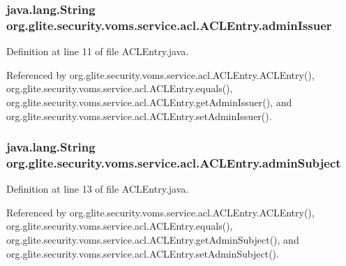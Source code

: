 \hypertarget{classorg_1_1glite_1_1security_1_1voms_1_1service_1_1acl_1_1ACLEntry_a04aa947f12248d78c84c941ef8cb8ab4}{
\subsubsection[{adminIssuer}]{\setlength{\rightskip}{0pt plus 5cm}java.lang.String {\bf org.glite.security.voms.service.acl.ACLEntry.adminIssuer}}}
\label{classorg_1_1glite_1_1security_1_1voms_1_1service_1_1acl_1_1ACLEntry_a04aa947f12248d78c84c941ef8cb8ab4}


Definition at line 11 of file ACLEntry.java.



Referenced by org.glite.security.voms.service.acl.ACLEntry.ACLEntry(), org.glite.security.voms.service.acl.ACLEntry.equals(), org.glite.security.voms.service.acl.ACLEntry.getAdminIssuer(), and org.glite.security.voms.service.acl.ACLEntry.setAdminIssuer().

\hypertarget{classorg_1_1glite_1_1security_1_1voms_1_1service_1_1acl_1_1ACLEntry_aa6011ea36c14ef998ec1966ee7188c2f}{
\subsubsection[{adminSubject}]{\setlength{\rightskip}{0pt plus 5cm}java.lang.String {\bf org.glite.security.voms.service.acl.ACLEntry.adminSubject}}}
\label{classorg_1_1glite_1_1security_1_1voms_1_1service_1_1acl_1_1ACLEntry_aa6011ea36c14ef998ec1966ee7188c2f}


Definition at line 13 of file ACLEntry.java.



Referenced by org.glite.security.voms.service.acl.ACLEntry.ACLEntry(), org.glite.security.voms.service.acl.ACLEntry.equals(), org.glite.security.voms.service.acl.ACLEntry.getAdminSubject(), and org.glite.security.voms.service.acl.ACLEntry.setAdminSubject().

